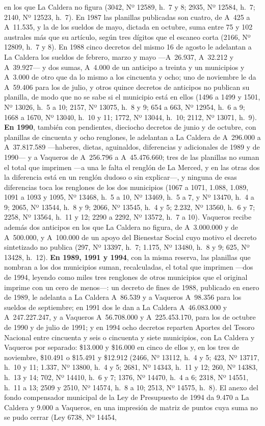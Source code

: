en los que La Caldera no figura (3042, Nº 12589, h.\ 7 y 8; 2935, Nº 12584, h.\ 7; 2140, Nº 12523, h.\ 7). En 1987 las planillas publicadas son cuatro, de A~425 a A~11.535, y la de los sueldos de mayo, dictada en octubre, suma entre 75 y 102 australes más que su artículo, según tres dígitos que el escaneo corta (2166, Nº 12809, h.\ 7 y 8). En 1988 cinco decretos del mismo 16 de agosto le adelantan a La Caldera los sueldos de febrero, marzo y mayo ---A~26.937, A~32.212 y A~39.927--- y dos sumas, A~4.000 de un anticipo a treinta y un municipios y A~3.000 de otro que da lo mismo a los cincuenta y ocho; uno de noviembre le da A~59.406 para los de julio, y otros quince decretos de anticipos no publican su planilla, de modo que no se sabe si el municipio está en ellos (1496 a 1499 y 1501, Nº 13026, h.\ 5 a 10; 2157, Nº 13075, h.\ 8 y 9; 654 a 663, Nº 12954, h.\ 6 a 9; 1668 a 1670, Nº 13040, h.\ 10 y 11; 1772, Nº 13044, h.\ 10; 2112, Nº 13071, h.\ 9). \textbf{En 1990}, también con pendientes, dieciocho decretos de junio y de octubre, con planillas de cincuenta y ocho renglones, le adelantan a La Caldera de A~296.000 a A~37.817.589 ---haberes, dietas, aguinaldos, diferencias y adicionales de 1989 y de 1990--- y a Vaqueros de A~256.796 a A~45.476.660; tres de las planillas no suman el total que imprimen ---a una le falta el renglón de La Merced, y en las otras dos la diferencia está en un renglón dudoso o sin explicar---, y ninguna de esas diferencias toca los renglones de los dos municipios (1067 a 1071, 1.088, 1.089, 1091 a 1093 y 1095, Nº 13468, h.\ 5 a 10, Nº 13469, h.\ 5 a 7, y Nº 13470, h.\ 4 a 9; 2065, Nº 13544, h.\ 8 y 9; 2066, Nº 13545, h.\ 4 y 5; 2.232, Nº 13560, h.\ 6 y 7; 2258, Nº 13564, h.\ 11 y 12; 2290 a 2292, Nº 13572, h.\ 7 a 10). Vaqueros recibe además dos anticipos en los que La Caldera no figura, de A~3.000.000 y de A~500.000, y A~100.000 de un apoyo del Bienestar Social cuyo motivo el decreto sintetizado no publica (297, Nº 13397, h.\ 7; 1.175, Nº 13480, h.\ 8 y 9; 625, Nº 13428, h.\ 12). \textbf{En 1989, 1991 y 1994}, con la misma reserva, las planillas que nombran a los dos municipios suman, recalculadas, el total que imprimen ---dos de 1994, leyendo como miles tres renglones de otros municipios que el original imprime con un cero de menos---: un decreto de fines de 1988, publicado en enero de 1989, le adelanta a La Caldera A~86.539 y a Vaqueros A~98.356 para los sueldos de septiembre; en 1991 dos le dan a La Caldera A~46.083.000 y A~247.227.247, y a Vaqueros A~56.708.000 y A~225.453.170, para los de octubre de 1990 y de julio de 1991; y en 1994 ocho decretos reparten Aportes del Tesoro Nacional entre cincuenta y seis o cincuenta y siete municipios, con La Caldera y Vaqueros por separado: \$13.000 y \$16.000 en cinco de ellos y, en los tres de noviembre, \$10.491 o \$15.491 y \$12.912 (2466, Nº 13112, h.\ 4 y 5; 423, Nº 13717, h.\ 10 y 11; 1.337, Nº 13800, h.\ 4 y 5; 2681, Nº 14343, h.\ 11 y 12; 260, Nº 14383, h.\ 13 y 14; 702, Nº 14410, h.\ 6 y 7; 1376, Nº 14470, h.\ 4 a 6; 2318, Nº 14551, h.\ 11 a 13; 2509 y 2510, Nº 14574, h.\ 8 a 10; 2513, Nº 14575, h.\ 8). El anexo del fondo compensador municipal de la Ley de Presupuesto de 1994 da 9.470 a La Caldera y 9.000 a Vaqueros, en una impresión de matriz de puntos cuya suma no se pudo cerrar (Ley 6738, Nº 14454, 